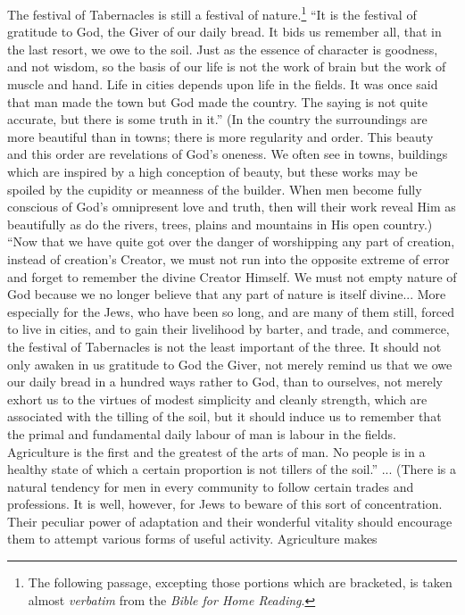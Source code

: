 The festival of Tabernacles is still a
festival of nature.\footnote{The following
passage, excepting those portions which
are bracketed, is taken almost \textsl{verbatim}
from the \textsl{Bible for Home Reading}.}
“It is the festival of
gratitude to God, the Giver of our daily
bread. It bids us remember all, that in the
last resort, we owe to the soil. Just as the
essence of character is goodness, and not
wisdom, so the basis of our life is not the
work of brain but the work of muscle and
hand. Life in cities depends upon life in the
fields. It was once said that man made the
town but God made the country. The saying
is not quite accurate, but there is some
truth in it.” (In the country the surroundings
are more beautiful than in towns; there
is more regularity and order. This beauty
and this order are revelations of God’s oneness.
We often see in towns, buildings
which are inspired by a high conception of
beauty, but these works may be spoiled by
the cupidity or meanness of the builder.
When men become fully conscious of God’s
omnipresent love and truth, then will their
work reveal Him as beautifully as do the
rivers, trees, plains and mountains in His
open country.) “Now that we have quite got
over the danger of worshipping any part of
creation, instead of creation’s Creator, we
must not run into the opposite extreme of
error and forget to remember the divine
Creator Himself. We must not empty
nature of God because we no longer believe
that any part of nature is itself divine...
More especially for the Jews, who have been
so long, and are many of them still, forced to
live in cities, and to gain their livelihood by
barter, and trade, and commerce, the festival
of Tabernacles is not the least important of
the three. It should not only awaken in us
gratitude to God the Giver, not merely
remind us that we owe our daily bread in a
hundred ways rather to God, than to ourselves,
not merely exhort us to the virtues of
modest simplicity and cleanly strength, which
are associated with the tilling of the soil, but
it should induce us to remember that the
primal and fundamental daily labour of man
is labour in the fields. Agriculture is the
first and the greatest of the arts of man.
No people is in a healthy state of which a
certain proportion is not tillers of the
soil.” ... (There is a natural tendency
for men in every community to follow certain
trades and professions. It is well,
however, for Jews to beware of this sort of
concentration. Their peculiar power of
adaptation and their wonderful vitality
should encourage them to attempt various
forms of useful activity. Agriculture makes
